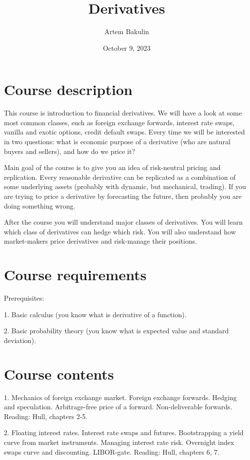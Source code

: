 \documentclass[a4paper,14pt]{extarticle}
\title{Derivatives}
\author{Artem Bakulin}
\date{October 9, 2023}
\begin{document}
\maketitle

\section*{Course description}
This course is introduction to financial derivatives. We will have a look at some most common
classes, such as foreign exchange forwards, interest rate swaps, vanilla and exotic options, credit
default swaps. Every time we will be interested in two questions: what is economic purpose of a
derivative (who are natural buyers and sellers), and how do we price it?

Main goal of the course is to give you an idea of risk-neutral pricing and replication. Every
reasonable derivative can be replicated as a combination of some underlying assets (probably
with dynamic, but mechanical, trading). If you are trying to price a derivative by forecasting the
future, then probably you are doing something wrong.

After the course you will understand major classes of derivatives. You will learn which class of
derivatives can hedge which risk. You will also understand how market-makers price derivatives
and risk-manage their positions.

\section*{Course requirements}

Prerequisites:

1. Basic calculus (you know what is derivative of a function).

2. Basic probability theory (you know what is expected value and standard deviation).

\section*{Course contents}

1. Mechanics of foreign exchange market. Foreign exchange forwards. Hedging and speculation.
Arbitrage-free price of a forward. Non-deliverable forwards.
Reading: Hull, chapters 2-5.

2. Floating interest rates. Interest rate swaps and futures. Bootstrapping a yield curve from
market instruments. Managing interest rate risk. Overnight index swaps curve and discounting.
LIBOR-gate.
Reading: Hull, chapters 6, 7.
\end{document}
